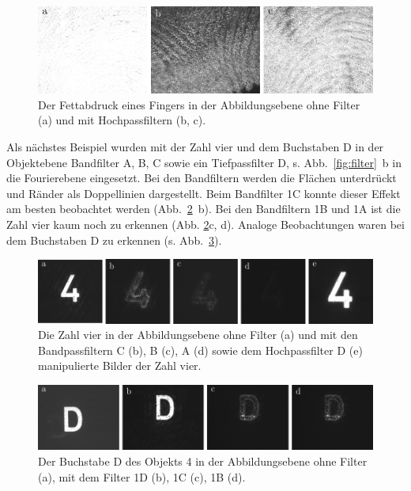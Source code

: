 \begin{figure}[h]
	\centering
	\includegraphics{images/ergebniss_Fingerab/abb.pdf}
	\caption[Bild eines Fettabdruck eines Fingers mit Filter bearbeitet]{
		Der Fettabdruck eines Fingers in der Abbildungsebene ohne Filter (a) und mit Hochpassfiltern (b, c).
	}
	\label{fig:example20_Hochpass}
\end{figure}

Als nächstes Beispiel wurden mit der Zahl vier und dem Buchstaben D in der Objektebene Bandfilter A, B, C  sowie ein Tiefpassfilter D, s. Abb.~\ref{fig:filter}~b in die Fourierebene eingesetzt. Bei den Bandfiltern werden die Flächen unterdrückt und Ränder als Doppellinien dargestellt. Beim Bandfilter 1C konnte dieser Effekt am besten beobachtet werden (Abb.~\ref{fig:vier_mit_breitband}~b). Bei den Bandfiltern 1B und 1A ist die Zahl vier kaum noch zu erkennen (Abb. \ref{fig:vier_mit_breitband}c, d). Analoge Beobachtungen waren bei dem Buchstaben D zu erkennen (s. Abb.~\ref{fig:example10_D_filter}).

\begin{figure}[h]
	\centering
	\includegraphics{images/Regina/abb22.pdf}
	\caption[Bild der Zahl 4 mit Filtern bearbeitet]{
		Die Zahl vier in  der Abbildungsebene ohne Filter (a) und mit den Bandpassfiltern C (b), B (c), A (d) sowie dem Hochpassfilter D (e) manipulierte Bilder der Zahl vier.
	}
	\label{fig:vier_mit_breitband}
\end{figure}

\begin{figure}[h]
	\centering
	\includegraphics{images/ergebniss_D/abb.pdf}
	\caption[Bild des Buchstaben D mit Filtern bearbeitet]{
		Der Buchstabe D des Objekts 4 in der Abbildungsebene ohne Filter (a), mit dem Filter 1D (b), 1C (c), 1B (d).
	}
	\label{fig:example10_D_filter}
\end{figure}


